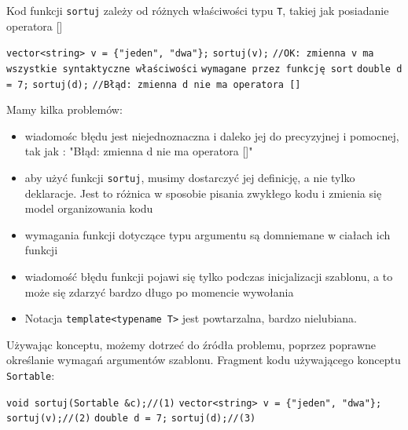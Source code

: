 \documentclass[11pt, a4paper]{article}
\begin{document}
Kod funkcji \verb#sortuj# zależy od różnych właściwości typu \verb#T#, takiej jak posiadanie operatora [] \newline

\noindent \verb#vector<string> v = {"jeden", "dwa"};# \newline
\verb#sortuj(v);# \newline
\verb#//OK: zmienna v ma wszystkie syntaktyczne właściwości# \newline
\verb#wymagane przez funkcję sort# \newline\newline
\verb#double d = 7;# \newline
\verb#sortuj(d);# \newline
\verb#//Błąd: zmienna d nie ma operatora []#\newline

\noindent Mamy kilka problemów:\newline
\begin{itemize}

\item wiadomośc błędu jest niejednoznaczna i daleko jej do precyzyjnej i pomocnej, tak jak : "Błąd: zmienna d nie ma operatora []"

\item aby użyć funkcji \verb#sortuj#, musimy dostarczyć jej definicję, a nie tylko deklaracje. Jest to różnica w sposobie pisania zwykłego kodu i zmienia się model organizowania kodu

\item wymagania funkcji dotyczące typu argumentu są domniemane w ciałach ich funkcji

\item wiadomość błędu funkcji pojawi się tylko podczas inicjalizacji szablonu, a to może się zdarzyć bardzo długo po momencie wywołania

\item Notacja \verb#template<typename T># jest powtarzalna, bardzo nielubiana.

\end{itemize}

Używając konceptu, możemy dotrzeć do źródła problemu, poprzez poprawne określanie wymagań argumentów szablonu. Fragment kodu używającego konceptu \verb#Sortable#:\newline

\noindent \verb#void sortuj(Sortable &c);//(1)#\newline
\verb#vector<string> v = {"jeden", "dwa"};#\newline
\verb#sortuj(v);//(2)# \newline
\verb#double d = 7;# \newline
\verb#sortuj(d);//(3)# \newline
\end{document}
